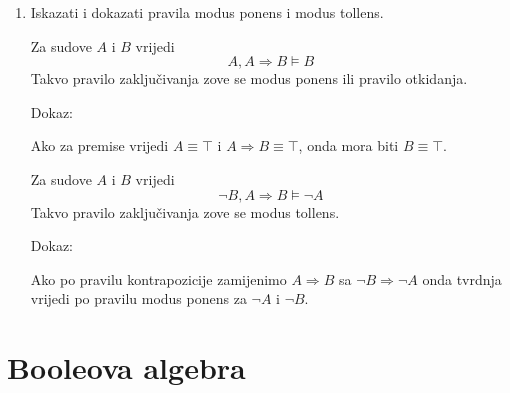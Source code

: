\documentclass{article}
\begin{document}
\begin{enumerate}
\item Iskazati i dokazati pravila modus ponens i modus tollens.

Za sudove $A$ i $B$ vrijedi $$A, A\Rightarrow B\vDash B$$ Takvo pravilo zaključivanja zove se modus ponens ili pravilo otkidanja.

Dokaz:

Ako za premise vrijedi $A\equiv\top$ i $A\Rightarrow B\equiv\top$, onda mora biti $B\equiv\top$.

Za sudove $A$ i $B$ vrijedi $$\neg B, A\Rightarrow B\vDash\neg A$$ Takvo pravilo zaključivanja zove se modus tollens.

Dokaz:

Ako po pravilu kontrapozicije zamijenimo $A\Rightarrow B$ sa $\neg B\Rightarrow\neg A$ onda tvrdnja vrijedi po pravilu modus ponens za $\neg A$ i $\neg B$.

\end{enumerate}

\color{brightlavender}
\section{Booleova algebra}
\color{white}
\end{document}
